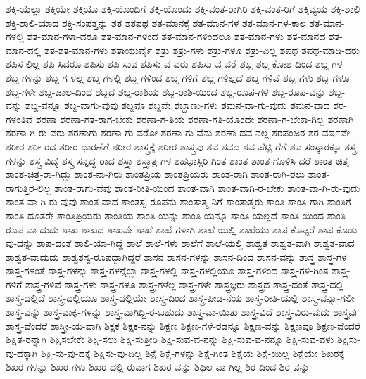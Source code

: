 {ಶಕ್ತಿ-ಯೆಲ್ಲಾ
ಶಕ್ತಿಯೇ
ಶಕ್ತಿಯೊ
ಶಕ್ತಿ-ಯೊಂದಿಗೆ
ಶಕ್ತಿ-ಯೊಂದು
ಶಕ್ತಿ-ವಂತ-ರಾಗಿರಿ
ಶಕ್ತಿ-ವಂತ-ರಿಗೆ
ಶಕ್ತಿವ್ಯಯ
ಶಕ್ತಿ-ಶಾಲಿ
ಶಕ್ತಿ-ಶಾಲಿ-ಯಾದ
ಶಕ್ತಿ-ಸಂಪತ್ತನ್ನು
ಶತ
ಶತಪಥ
ಶತ-ಮಾನಕ್ಕೆ
ಶತ-ಮಾನ-ಗಳ
ಶತ-ಮಾನ-ಗಳ-ಕಾಲ
ಶತ-ಮಾನ-ಗಳಲ್ಲಿ
ಶತ-ಮಾನ-ಗಳಾ-ದರೂ
ಶತ-ಮಾನ-ಗಳಿಂದ
ಶತ-ಮಾನ-ಗಳಿಂದಲೂ
ಶತ-ಮಾನ-ಗಳು
ಶತ-ಮಾನದ
ಶತ-ಮಾನ-ದಲ್ಲಿ
ಶತ-ಶತ-ಮಾನ-ಗಳು
ಶತಾಯುರ್ವೈ
ಶತ್ರು
ಶತ್ರು-ಗಳು
ಶತ್ರು-ಗಳೂ
ಶತ್ರು-ವಿಲ್ಲ
ಶಪಥ
ಶಪಥ-ಮಾಡಿ-ದರು
ಶಪಿಸ-ಲಿಲ್ಲ
ಶಪಿ-ಸಿದರೂ
ಶಪಿಸು
ಶಪಿ-ಸುವ
ಶಪಿಸು-ವ-ವರು
ಶಪಿಸು-ವ-ವರೆ
ಶಬ್ದ
ಶಬ್ದ-ಕೋಶ-ದಿಂದ
ಶಬ್ದ-ಗಳ
ಶಬ್ದ-ಗಳನ್ನು
ಶಬ್ದ-ಗ-ಳಲ್ಲ
ಶಬ್ದ-ಗಳಲ್ಲಿ
ಶಬ್ದ-ಗಳಿಂದ
ಶಬ್ದ-ಗಳಿಗೆ
ಶಬ್ದ-ಗಳಿಲ್ಲದೆ
ಶಬ್ದ-ಗಳಿವೆ
ಶಬ್ದ-ಗಳು
ಶಬ್ದ-ಗಳೂ
ಶಬ್ದ-ಗಳೇ
ಶಬ್ದ-ಜಾಲ-ದಿಂದ
ಶಬ್ದದ
ಶಬ್ದ-ರಾಶಿಯ
ಶಬ್ದ-ರಾಶಿ-ಯಿಂದ
ಶಬ್ದ-ರೂಪ-ಗಳ
ಶಬ್ದ-ರೂಪ-ವನ್ನು
ಶಬ್ದ-ವನ್ನು
ಶಬ್ದ-ವನ್ನೂ
ಶಬ್ದ-ವಾಗು-ವುವು
ಶಬ್ದವೂ
ಶಬ್ದವೇ
ಶಬ್ದಾಣು-ಗಳು
ಶಮನ-ವಾ-ಗು-ವುದು
ಶಮನ-ವಾದ
ಶರ-ಗಳಂತಿವೆ
ಶರಣಾ
ಶರಣಾ-ಗತ-ರಾಗ-ಬೇಕು
ಶರಣಾ-ಗ-ತಿಯ
ಶರಣಾ-ಗತಿ-ಯೊಂದೇ
ಶರಣಾ-ಗ-ಬೇಕಾ-ಗಿಲ್ಲ
ಶರಣಾಗಿ
ಶರಣಾ-ಗಿ-ರು-ವರು
ಶರಣಾಗು
ಶರಣಾ-ಗು-ವರೋ
ಶರಣಾ-ಗು-ವೆನು
ಶರಣಾ-ದವ-ನಲ್ಲ
ಶರಪಂಜರ
ಶರ-ವರ್ಷವೇ
ಶರೀರ
ಶರೀ-ರದ
ಶರೀರ-ಧಾರಣೆಗೆ
ಶರೀರ-ಶಾಸ್ತ್ರಕ್ಕೆ
ಶರೀರ-ಶಾಸ್ತ್ರವು
ಶವ
ಶವದ
ಶವ-ಪೆಟ್ಟಿ-ಗೆಗೆ
ಶವ-ಸಂಸ್ಕಾರಕ್ಕೂ
ಶಸ್ತ್ರ-ಗಳನ್ನು
ಶಸ್ತ್ರ-ವಿದ್ಯೆ
ಶಸ್ತ್ರ-ಸನ್ನದ್ಧ-ರಾದ
ಶಸ್ತ್ರಾ
ಶಸ್ತ್ರಾತ್ರ-ಗಳ
ಶಹಭಾಸ್ಗಿರಿ-ಗಿಂತ
ಶಾಂತ
ಶಾಂತ-ಗೊಳಿಸಿ-ದರೆ
ಶಾಂತ-ಚಿತ್ತ
ಶಾಂತ-ಚಿತ್ತ-ರಾ-ಗಿದ್ದು
ಶಾಂತ-ನಾ-ಗಿರು
ಶಾಂತಪ್ರಿಯ
ಶಾಂತಪ್ರಿಯರು
ಶಾಂತ-ರಾಗಿ
ಶಾಂತ-ರಾಗಿ-ರಲು
ಶಾಂತ-ರಾಗುತ್ತಿರ-ಲಿಲ್ಲ
ಶಾಂತ-ರಾಗು-ವೆವು
ಶಾಂತ-ರೀತಿ-ಯಿಂದ
ಶಾಂತ-ವಾಗಿ
ಶಾಂತ-ವಾಗಿ-ರ-ಬೇಕು
ಶಾಂತ-ವಾ-ಗಿ-ರು-ವುದು
ಶಾಂತ-ವಾ-ಗಿ-ರು-ವುವು
ಶಾಂತ-ವಾದ
ಶಾಂತಸ್ವ-ರೂಪನು
ಶಾಂತಾತ್ಮ-ನಿಗೆ
ಶಾಂತಾತ್ಮರು
ಶಾಂತಿ
ಶಾಂತಿ-ಗಾಗಿ
ಶಾಂತಿಗೆ
ಶಾಂತಿ-ದೂತರೇ
ಶಾಂತಿಪ್ರಿಯರು
ಶಾಂತಿಯ
ಶಾಂತಿ-ಯನ್ನು
ಶಾಂತಿ-ಯನ್ನೂ
ಶಾಂತಿ-ಯಲ್ಲದೆ
ಶಾಂತಿ-ಯಿಂದ
ಶಾಂತಿ-ರೂಪ-ವಾ-ದುದು
ಶಾಖ
ಶಾಖದ
ಶಾಖವೇ
ಶಾಖೆ
ಶಾಖೆ-ಗಳಾಗಿ
ಶಾಖೆ-ಯಲ್ಲಿ
ಶಾಖೆಯು
ಶಾಪ-ಕೊಟ್ಟರೆ
ಶಾಪ-ಕೊಡು-ವು-ದನ್ನು
ಶಾಪ-ದಂತೆ
ಶಾಲಿ-ಯಾ-ಗಿದ್ದೆ
ಶಾಲೆ
ಶಾಲೆ-ಗಳು
ಶಾಲೆಗೆ
ಶಾಲೆ-ಯಲ್ಲಿ
ಶಾಶ್ವತ
ಶಾಶ್ವತ-ವಾಗಿ
ಶಾಶ್ವತ-ವಾದ
ಶಾಶ್ವತ-ವಾದುದು
ಶಾಶ್ವತಸ್ವ-ರೂಪದ್ದಾಗಿದ್ದರೆ
ಶಾಸನ
ಶಾಸನ-ಗಳನ್ನು
ಶಾಸನ-ದಿಂದ
ಶಾಸನ-ವನ್ನು
ಶಾಸ್ತ್ರ
ಶಾಸ್ತ್ರ-ಗಳ
ಶಾಸ್ತ್ರ-ಗಳಂತೆ
ಶಾಸ್ತ್ರ-ಗಳನ್ನು
ಶಾಸ್ತ್ರ-ಗಳನ್ನೆಲ್ಲಾ
ಶಾಸ್ತ್ರ-ಗಳಲ್ಲಿ
ಶಾಸ್ತ್ರ-ಗಳಲ್ಲಿಯೂ
ಶಾಸ್ತ್ರ-ಗಳಿಂದ
ಶಾಸ್ತ್ರ-ಗಳಿ-ಗಿಂತ
ಶಾಸ್ತ್ರ-ಗಳಿಗೆ
ಶಾಸ್ತ್ರ-ಗಳಿವೆ
ಶಾಸ್ತ್ರ-ಗಳು
ಶಾಸ್ತ್ರ-ಗಳೂ
ಶಾಸ್ತ್ರ-ಗಳೆಲ್ಲ
ಶಾಸ್ತ್ರ-ಗಳೇ
ಶಾಸ್ತ್ರಜ್ಞರು
ಶಾಸ್ತ್ರದ
ಶಾಸ್ತ್ರ-ದಂತೆ
ಶಾಸ್ತ್ರ-ದಲ್ಲಿ
ಶಾಸ್ತ್ರ-ದಲ್ಲಿದೆ
ಶಾಸ್ತ್ರ-ದಲ್ಲಿಯೂ
ಶಾಸ್ತ್ರ-ದಲ್ಲಿಯೇ
ಶಾಸ್ತ್ರ-ದಿಂದ
ಶಾಸ್ತ್ರ-ಪೀಡ-ನೆಯ
ಶಾಸ್ತ್ರ-ರೀತಿ-ಯಲ್ಲಿ
ಶಾಸ್ತ್ರ-ವನ್ನಾ-ಗಲೀ
ಶಾಸ್ತ್ರ-ವನ್ನು
ಶಾಸ್ತ್ರ-ವಾಕ್ಯ-ಗಳನ್ನು
ಶಾಸ್ತ್ರ-ವಾಗಿದ್ದಿ-ರ-ಬಹುದು
ಶಾಸ್ತ್ರ-ವಾ-ಯಿತು
ಶಾಸ್ತ್ರ-ವಿದೆ
ಶಾಸ್ತ್ರ-ವಿರು-ವುದು
ಶಾಸ್ತ್ರವು
ಶಾಸ್ತ್ರ-ವೆಂದರೆ
ಶಾಸ್ತ್ರೀ-ಯ-ವಾಗಿ
ಶಿಕ್ಷಕ
ಶಿಕ್ಷಕ-ನನ್ನು
ಶಿಕ್ಷಣ
ಶಿಕ್ಷಣ-ಗಳೆ-ರಡನ್ನೂ
ಶಿಕ್ಷಣ-ವನ್ನು
ಶಿಕ್ಷಣವೂ
ಶಿಕ್ಷಣ-ವೆಂದರೆ
ಶಿಕ್ಷಿತ-ರನ್ನಾಗಿ
ಶಿಕ್ಷಿಸಬೇಕೇ
ಶಿಕ್ಷಿ-ಸಲು
ಶಿಕ್ಷಿ-ಸುತ್ತೀರಿ
ಶಿಕ್ಷಿ-ಸುವ-ವ-ನನ್ನು
ಶಿಕ್ಷಿ-ಸುವ-ವ-ನನ್ನೂ
ಶಿಕ್ಷಿ-ಸುವ-ವಳು
ಶಿಕ್ಷಿಸು-ವು-ದಕ್ಕಾಗಿ
ಶಿಕ್ಷಿ-ಸು-ವು-ದಕ್ಕೆ
ಶಿಕ್ಷಿಸು-ವು-ದಿಲ್ಲ
ಶಿಕ್ಷೆ
ಶಿಕ್ಷೆ-ಗಳನ್ನು
ಶಿಕ್ಷೆ-ಗಿಂತ
ಶಿಕ್ಷೆಯ
ಶಿಕ್ಷೆ-ಯಿಲ್ಲ
ಶಿಕ್ಷೆಯೇ
ಶಿಖರಕ್ಕೆ
ಶಿಖರ-ಗಳನ್ನು
ಶಿಖರ-ಗಳು
ಶಿಖರ-ದಲ್ಲಿ-ರುವಾಗ
ಶಿಖರ-ವನ್ನು
ಶಿಥಿಲ-ವಾ-ಗಿಲ್ಲ
ಶಿರ-ದಿಂದ
ಶಿರ-ವನ್ನು
}
